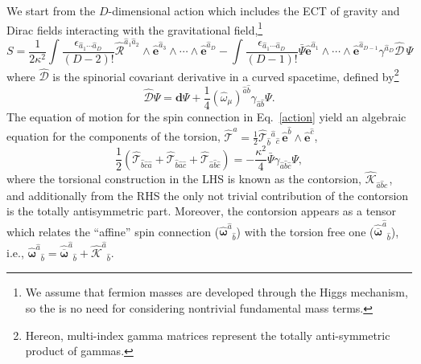 \documentclass{ws-mpla}
\newcommand{\cdf}[1][]{{\boldsymbol{\mathcal{D}}}{#1}}
\newcommand{\df}[1][]{\mathbf{d}{#1}}
\newcommand{\ga}{\gamma}
\newcommand{\tor}{\mathcal{T}}
\newcommand{\we}{{\scriptstyle\wedge}}
\newcommand{\Bps}{\ensuremath{\bar{\Psi}}}
\newcommand\VIF[1]{\hat{\boldsymbol{e}}^{\hat{#1}}}
\newcommand\hvif[1]{\hat{\boldsymbol{e}}^{{#1}}}
\newcommand\SPIF[2]{\hat{\boldsymbol{\omega}}^{\hat{#1}}{}_{\hat{#2}}}
\newcommand\hspi[1]{\hat{\omega}_{{#1}}}
\newcommand{\hRif}[2]{\hat{\boldsymbol{\mathcal{R}}}^{{#1}}{}_{{#2}}}
\newcommand{\TF}[1]{\hat{\boldsymbol{\mathcal{T}}}^{\hat{#1}}}
\newcommand{\hcont}[3]{\hat{\mathcal{K}}_{#1}{}^{#2}{}_{#3}}
\newcommand{\CONTF}[2]{\hat{\boldsymbol{\mathcal{K}}}^{\hat{#1}}{}_{\hat{#2}}}
\renewcommand{\(}{\left(}
\renewcommand{\)}{\right)}
\renewcommand{\[}{\left[}
\renewcommand{\]}{\right]}
\begin{document}
We start from the $D$-dimensional action which includes the ECT of gravity and Dirac fields interacting with the gravitational field,\footnote{We assume that fermion masses are developed through the Higgs mechanism, so the is no need for considering nontrivial fundamental mass terms.}
\begin{equation}
  S = \frac{1}{2\kappa^2}\int\frac{\epsilon_{\hat{a}_1\cdots \hat{a}_D}}{(D-2)!}\hRif{\hat{a}_1 \hat{a}_2}{} \we \hvif{\hat{a}_3} \we \cdots \we \hvif{\hat{a}_D} - \int \frac{\epsilon_{\hat{a}_1\cdots \hat{a}_D}}{(D-1)!} \Bps \hvif{\hat{a}_1} \we \cdots \we \hvif{\hat{a}_{D-1}}\ga^{\hat{a}_D} \hat{\cdf} \, \Psi
  \label{action}
\end{equation}
where $\hat{\cdf}$ is the spinorial covariant derivative in a curved spacetime, defined by\footnote{Hereon, multi-index gamma matrices represent the totally anti-symmetric product of gammas.}
\begin{equation*}
  \hat{\cdf} \Psi = \df[\Psi] + \frac{1}{4} (\hspi{\mu})^{\hat{a} \hat{b}} \ga_{\hat{a} \hat{b}} \Psi.
\end{equation*}
The equation of motion for the spin connection in Eq.~\eqref{action} yield an algebraic equation for the components of the torsion, $\TF{a} = \tfrac{1}{2} \hat{\tor}{}_{\hat{b}}{}^{\hat{a}}{}_{\hat{c}} \, \VIF{b} \we \VIF{c}$, 
\begin{equation}
  \frac{1}{2}\(\hat{\tor}_{\hat{b} \hat{c} \hat{a} } + \hat{\tor}_{\hat{b} \hat{a} \hat{c} } + \hat{\tor}_{\hat{a} \hat{b} \hat{c} }\) = -\frac{\kappa^2}{4} \bar{\Psi}\ga_{\hat{a} \hat{b} \hat{c}}\Psi,
  \label{tor-eom}
\end{equation}
where the torsional construction in the LHS is known as the contorsion, $\hcont{\hat{a} \hat{b} \hat{c} }{}{}$, and additionally from the RHS the only not trivial contribution of the contorsion is the totally antisymmetric part. Moreover, the contorsion appears as a tensor which relates the ``affine'' spin connection ($\SPIF{a}{b}$) with the torsion free one ($\hat{\overline{\boldsymbol{\omega}}}^{\hat{a}}{}_{\hat{b}}$), i.e., \mbox{$\SPIF{a}{b} = \hat{\overline{\boldsymbol{\omega}}}^{\hat{a}}{}_{\hat{b}}+\CONTF{a}{b}.$}  %
\end{document}
